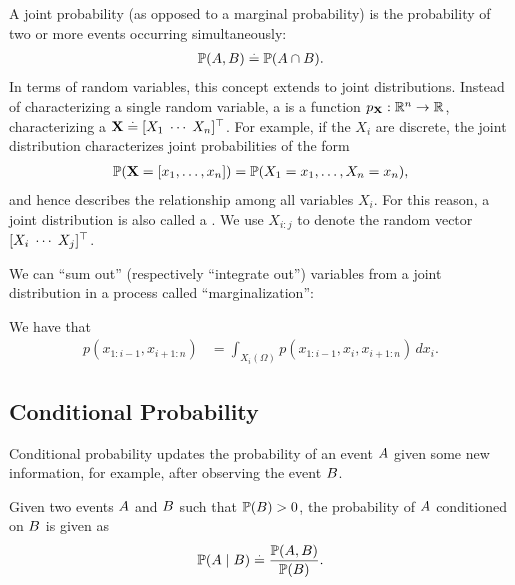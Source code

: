 A joint probability (as opposed to a marginal probability) is the probability of two or more events occurring simultaneously: \begin{align}
  \Pr{\sA, \sB} \defeq \Pr{\sA \cap \sB}.
\end{align}
In terms of random variables, this concept extends to joint distributions.
Instead of characterizing a single random variable, a  is a function $p_{\mathbf{X}} : \mathbb{R}^n \to \mathbb{R}$, characterizing a  $\mathbf{X} \overset{.}{=} [X_1 \; \cdots \;X_n]^\top$.
For example, if the $X_i$ are discrete, the joint distribution characterizes joint probabilities of the form \begin{align*}
  \Pr{\rX = [x_1, \dots, x_n]} = \Pr{X_1 = x_1, \dots, X_n = x_n},
\end{align*} and hence describes the relationship among all variables $X_i$.
For this reason, a joint distribution is also called a .
We use $X_{i:j}$ to denote the random vector $[X_i \; \cdots \; X_j]^\top$.

We can ``sum out'' (respectively ``integrate out'') variables from a joint distribution in a process called ``marginalization'':

\begin{thmb}
  \begin{fct} We have that
    \begin{align}
      p(x_{1:i-1}, x_{i+1:n}) &= \int_{X_i(\Omega)} p(x_{1:i-1}, x_i, x_{i+1:n}) \,dx_i. \label{eq:sum_rule}
    \end{align}
  \end{fct}
\end{thmb}

\subsection{Conditional Probability}

Conditional probability updates the probability of an event $A$ given some new information, for example, after observing the event $B$.

\begin{defn}
  Given two events $A$ and $B$ such that $\Pr{\sB} > 0$, the probability of $A$ conditioned on $B$ is given as \begin{align}
    \Pr{\sA \mid \sB} \defeq \frac{\Pr{\sA, \sB}}{\Pr{\sB}}. \label{eq:cond_prob}
  \end{align}
\end{defn}


